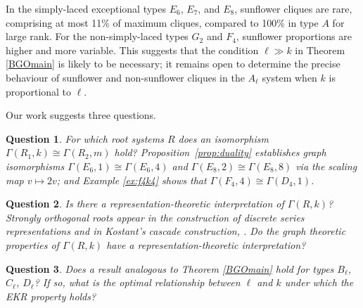 \documentclass[11pt]{article}
\newtheorem{question}{Question}
\begin{document}
In the simply-laced exceptional types $E_6$, $E_7$, and $E_8$, sunflower cliques are rare, comprising at most 11\% of maximum cliques, compared to 100\% in type $A$ for large rank. For the non-simply-laced types $G_2$ and $F_4$, sunflower proportions are higher and more variable. This suggests that the condition $\ell \gg k$ in Theorem \ref{BGOmain} is likely to be necessary; it remains open to determine the precise behaviour of sunflower and non-sunflower cliques in the $A_\ell$ system when $k$ is proportional to $\ell$.

Our work suggests three questions. 

\begin{question}
For which root systems $R$ does an isomorphism $\Gamma(R_1, k) \cong \Gamma(R_2, m)$ hold? Proposition~\ref{prop:duality} establishes graph isomorphisms $\Gamma(E_6, 1) \cong \Gamma(E_6, 4)$ and $\Gamma(E_8, 2) \cong \Gamma(E_8, 8)$ via the scaling map $v \mapsto 2v$; and Example \ref{ex:f4k4} shows that $\Gamma(F_4, 4) \cong \Gamma(D_4, 1)$.  
\end{question}

\begin{question}
Is there a representation-theoretic interpretation of $\Gamma(R,k)$? Strongly orthogonal roots appear in the construction of discrete series representations and in Kostant's cascade construction, \cite{HarishChandra, KostantCascade}. Do the graph theoretic properties of $\Gamma(R,k)$ have a representation-theoretic interpretation?
\end{question}

\begin{question}
Does a result analogous to Theorem \ref{BGOmain} hold for types $B_\ell$, $C_\ell$, $D_\ell$? If so, what is the optimal relationship between $\ell$ and $k$ under which the EKR property holds? 
\end{question}
\end{document}
